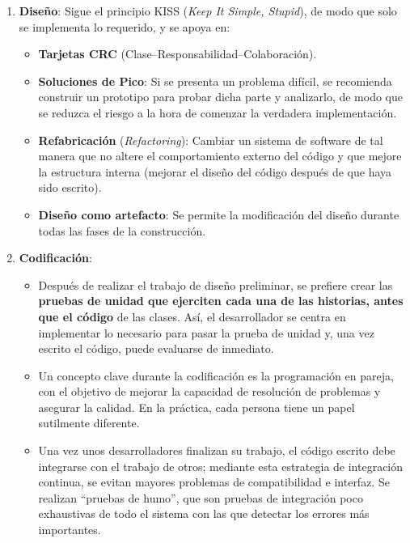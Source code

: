 \begin{enumerate}
   \item \textbf{Diseño}: Sigue el principio KISS (\textit{Keep It Simple, Stupid}), de modo que solo se implementa lo requerido, y se apoya en:
         \begin{itemize} %
            \item \textbf{Tarjetas CRC} (Clase--Responsabilidad--Colaboración).
            \item \textbf{Soluciones de Pico}: Si se presenta un problema difícil, se recomienda construir un prototipo para probar dicha parte y analizarlo, de modo que se reduzca el riesgo a la hora de comenzar la verdadera implementación.
            \item \textbf{Refabricación} (\textit{Refactoring}): Cambiar un sistema de software de tal manera que no altere el comportamiento externo del código y que mejore la estructura interna (mejorar el diseño del código después de que haya sido escrito).
            \item \textbf{Diseño como artefacto}: Se permite la modificación del diseño durante todas las fases de la construcción.
         \end{itemize}

   \item \textbf{Codificación}:
   
   \begin{itemize}
      \item Después de realizar el trabajo de diseño preliminar, se prefiere crear las \textbf{pruebas de unidad que ejerciten cada una de las historias, antes que el código} de las clases. Así, el desarrollador se centra en implementar lo necesario para pasar la prueba de unidad y, una vez escrito el código, puede evaluarse de inmediato.
      \item Un concepto clave durante la codificación es la programación en pareja, con el objetivo de mejorar la capacidad de resolución de problemas y asegurar la calidad. En la práctica, cada persona tiene un papel sutilmente diferente.
      \item Una vez unos desarrolladores finalizan su trabajo, el código escrito debe integrarse con el trabajo de otros; mediante esta estrategia de integración continua, se evitan mayores problemas de compatibilidad e interfaz. Se realizan ``pruebas de humo'', que son pruebas de integración poco exhaustivas de todo el sistema con las que detectar los errores más importantes.
   \end{itemize}


\end{enumerate}
